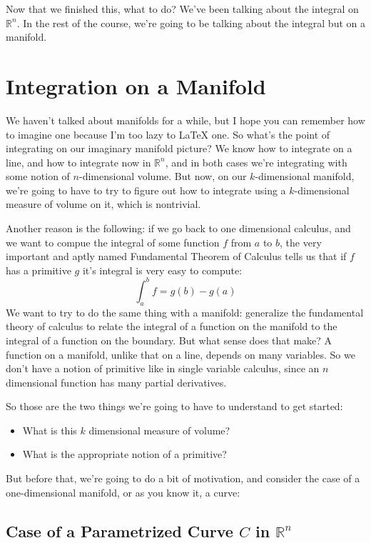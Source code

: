 \documentclass{article}
\newcommand{\reals}[0]{\mathbb{R}}
\begin{document}
\begin{itemize}
  Now that we finished this, what to do? We've been talking about the integral on \(\reals^n\). In the rest of the course, we're going to be talking about the integral but on a manifold.

  \section{Integration on a Manifold}

  We haven't talked about manifolds for a while, but I hope you can remember how to imagine one because I'm too lazy to {\LaTeX} one. So what's the point of integrating on our imaginary manifold picture? We know how to integrate on a line, and how to integrate now in \(\reals^n\), and in both cases we're integrating with some notion of \(n\)-dimensional volume. But now, on our \(k\)-dimensional manifold, we're going to have to try to figure out how to integrate using a \(k\)-dimensional measure of volume on it, which is nontrivial.

  Another reason is the following: if we go back to one dimensional calculus, and we want to compue the integral of some function \(f\) from \(a\) to \(b\), the very important and aptly named Fundamental Theorem of Calculus tells us that if \(f\) has a primitive \(g\) it's integral is very easy to compute:
  \begin{equation}
    \int_a^bf = g(b) - g(a)
  \end{equation}
  We want to try to do the same thing with a manifold: generalize the fundamental theory of calculus to relate the integral of a function on the manifold to the integral of a function on the boundary. But what sense does that make? A function on a manifold, unlike that on a line, depends on many variables. So we don't have a notion of primitive like in single variable calculus, since an \(n\) dimensional function has many partial derivatives.

  So those are the two things we're going to have to understand to get started:
  \begin{itemize}
    \item What is this \(k\) dimensional measure of volume?
    \item What is the appropriate notion of a primitive?
  \end{itemize}
  But before that, we're going to do a bit of motivation, and consider the case of a one-dimensional manifold, or as you know it, a curve:

  \subsection{Case of a Parametrized Curve \(C\) in \(\reals^n\)}


\end{itemize}
\end{document}
